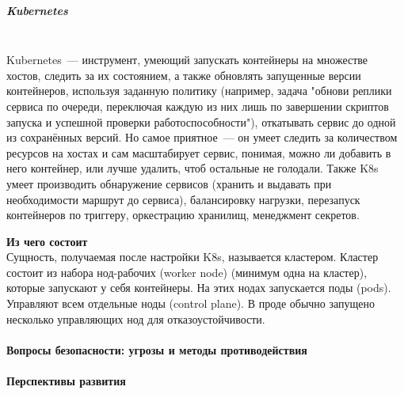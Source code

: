 \subparagraph{Kubernetes} ~\\
    Kubernetes~--- инструмент, умеющий запускать контейнеры на множестве хостов, следить за их состоянием, а также обновлять запущенные версии контейнеров, используя заданную политику (например, задача "обнови реплики сервиса по очереди, переключая каждую из них лишь по завершении скриптов запуска и успешной проверки работоспособности"), откатывать сервис до одной из сохранённых версий. Но самое приятное~--- он умеет следить за количеством ресурсов на хостах и сам масштабирует сервис, понимая, можно ли добавить в него контейнер, или лучше удалить, чтоб остальные не голодали. Также K8s умеет производить обнаружение сервисов (хранить и выдавать при необходимости маршрут до сервиса), балансировку нагрузки, перезапуск контейнеров по триггеру, оркестрацию хранилищ, менеджмент секретов.

    \textbf{Из чего состоит} ~\\
    Сущность, получаемая после настройки K8s, называется кластером. Кластер состоит из набора нод-рабочих (worker node) (минимум одна на кластер), которые запускают у себя контейнеры. На этих нодах запускается поды (pods). Управляют всем отдельные ноды (control plane). В проде обычно запущено несколько управляющих нод для отказоустойчивости.\autocite{KuberComponents}

\paragraph{Вопросы безопасности: угрозы и методы противодействия}
\paragraph{Перспективы развития}
